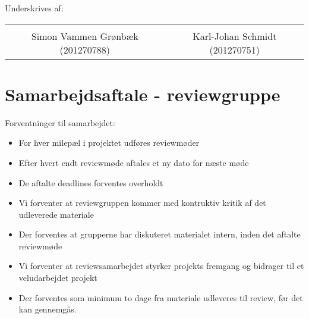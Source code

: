 \hspace{3cm}

Underskrives af: 




\begin{table}[H]
	\centering
	\begin{tabular}{c c}
		\underline{\phantom{mmmmmmmmmmmmmmmmmmmmm}} & \underline{\phantom{mmmmmmmmmmmmmmmmmmmmm}} \\
		Simon Vammen Grønbæk (201270788) \vspace{2cm} & Karl-Johan Schmidt (201270751) \vspace{2cm}\\
	\end{tabular}
\end{table}

\newpage
\section{Samarbejdsaftale - reviewgruppe}\label{title:samarbejdsaftaleReview}

Forventninger til samarbejdet:
\begin{itemize}
	\item For hver milepæl i projektet udføres reviewmøder
	\item Efter hvert endt reviewmøde aftales et ny dato for næste møde
	\item De aftalte deadlines forventes overholdt
	\item Vi forventer at reviewgruppen kommer med kontruktiv kritik af det udleverede materiale
	\item Der forventes at grupperne har diskuteret materialet intern, inden det aftalte reviewmøde
	\item Vi forventer at reviewsamarbejdet styrker projekts fremgang og bidrager til et veludarbejdet projekt
	\item Der forventes som minimum to dage fra materiale udleveres til review, før det kan gennemgås. 
\end{itemize}

\hspace{3cm}

